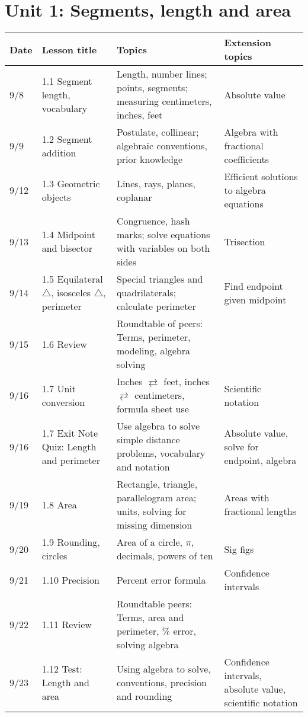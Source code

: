 

\geometry{hoffset=-0.5in, textwidth=7.5in}

\fancyhead[RE]{\thepage}
\fancyhead[RO]{\thepage }%



\section*{Unit 1: Segments, length and area}
\begin{tabular}{|p{0.9cm}|p{4cm}|p{7cm}|p{5cm}|}
  \hline
  Date & Lesson title & Topics  & Extension topics \\
  \hline
  9/8 & 1.1 Segment length, vocabulary & Length, number lines; points, segments; measuring centimeters, inches, feet & Absolute value \\
  \hline
  9/9 & 1.2 Segment addition & Postulate, collinear; algebraic conventions, prior knowledge & Algebra with fractional coefficients \\
  \hline
  9/12 & 1.3 Geometric objects & Lines, rays, planes, coplanar & Efficient solutions to algebra equations \\
  \hline
  9/13 & 1.4 Midpoint and bisector & Congruence, hash marks; solve equations with variables on both sides & Trisection \\
  \hline
  9/14 & 1.5 Equilateral $\triangle$, isosceles $\triangle$, perimeter & Special triangles and quadrilaterals; calculate perimeter & Find endpoint given midpoint \\
  \hline
  9/15 & 1.6 Review & Roundtable of peers: Terms, perimeter, modeling, algebra solving & \\
  \hline
  9/16 & 1.7 Unit conversion & Inches $\rightleftarrows$ feet, inches $\rightleftarrows$ centimeters, formula sheet use & Scientific notation \\
  \hline
  9/16 & 1.7 Exit Note Quiz: Length and perimeter & Use algebra to solve simple distance problems, vocabulary and notation & Absolute value, solve for endpoint, algebra \\
  \hline
  9/19 & 1.8 Area & Rectangle, triangle, parallelogram area; units, solving for missing dimension & Areas with fractional lengths \\
  \hline
  9/20 & 1.9 Rounding, circles & Area of a circle, $\pi$, decimals, powers of ten & Sig figs \\
  \hline
  9/21 & 1.10 Precision & Percent error formula & Confidence intervals \\
  \hline
  9/22 & 1.11 Review & Roundtable peers: Terms, area and perimeter, \% error, solving algebra & \\
  \hline
  9/23 & 1.12 Test: Length and area & Using algebra to solve, conventions, precision and rounding & Confidence intervals, absolute value, scientific notation \\
  \hline

\end{tabular} \par \vspace*{0.3cm}

